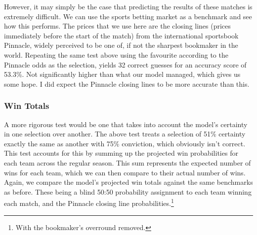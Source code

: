 However, it may simply be the case that predicting the results of these matches is extremely difficult. We can use the sports betting market as a benchmark and see how this performs. The prices that we use here are the closing lines (prices immediately before the start of the match) from the international sportsbook Pinnacle\footnotemark{}, widely perceived to be one of, if not the sharpest bookmaker in the world. \cite{norheim_closing_2017} Repeating the same test above using the favourite according to the Pinnacle odds as the selection, yields 32 correct guesses for an accuracy score of 53.3\%. Not significantly higher than what our model managed, which gives us some hope. I did expect the Pinnacle closing lines to be more accurate than this.


\subsubsection{Win Totals}

A more rigorous test would be one that takes into account the model's certainty in one selection over another. The above test treats a selection of 51\% certainty exactly the same as another with 75\% conviction, which obviously isn't correct. This test accounts for this by summing up the projected win probabilities for each team across the regular season. This sum represents the expected number of wins for each team, which we can then compare to their actual number of wins. Again, we compare the model's projected win totals against the same benchmarks as before. These being a blind 50:50 probability assignment to each team winning each match, and the Pinnacle closing line probabilities.\footnote{With the bookmaker's overround removed.}

